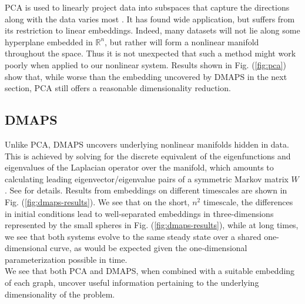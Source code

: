 \documentclass[12pt]{article}
\begin{document}
\begin{onehalfspace}
PCA is used to linearly project data into subspaces that capture the directions along with the data varies most \cite{jolliffe_principal_2014}. It has found wide application, but suffers from its restriction to linear embeddings. Indeed, many datasets will not lie along some hyperplane embedded in $\mathbb{R}^n$, but rather will form a nonlinear manifold throughout the space. Thus it is not unexpected that such a method might work poorly when applied to our nonlinear system. Results shown in Fig. (\ref{fig:pca}) show that, while worse than the embedding uncovered by DMAPS in the next section, PCA still offers a reasonable dimensionality reduction.

\subsection{DMAPS}

Unlike PCA, DMAPS uncovers underlying nonlinear manifolds hidden in data. This is achieved by solving for the discrete equivalent of the eigenfunctions and eigenvalues of the Laplacian operator over the manifold, which amounts to calculating leading eigenvector/eigenvalue pairs of a symmetric Markov matrix $W$. See \cite{coifman_diffusion_2006, nadler_diffusion_2006} for details. Results from embeddings on different timescales are shown in Fig. (\ref{fig:dmaps-results}). We see that on the short, $n^2$ timescale, the differences in initial conditions lead to well-separated embeddings in three-dimensions represented by the small spheres in Fig. (\ref{fig:dmaps-results}), while at long times, we see that both systems evolve to the same steady state over a shared one-dimensional curve, as would be expected given the one-dimensional parameterization possible in time. \\

We see that both PCA and DMAPS, when combined with a suitable embedding of each graph, uncover useful information pertaining to the underlying dimensionality of the problem.



\end{onehalfspace}
\end{document}
